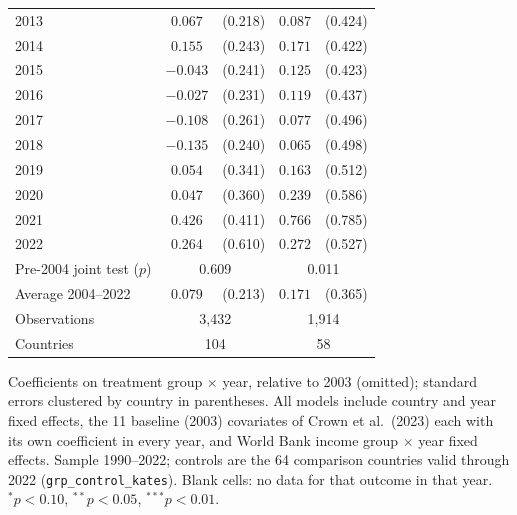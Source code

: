 \begin{table}[htbp]
\begin{tabular}{lcccc}
2013 & $0.067$ & (0.218) & $0.087$ & (0.424) \\
2014 & $0.155$ & (0.243) & $0.171$ & (0.422) \\
2015 & $-0.043$ & (0.241) & $0.125$ & (0.423) \\
2016 & $-0.027$ & (0.231) & $0.119$ & (0.437) \\
2017 & $-0.108$ & (0.261) & $0.077$ & (0.496) \\
2018 & $-0.135$ & (0.240) & $0.065$ & (0.498) \\
2019 & $0.054$ & (0.341) & $0.163$ & (0.512) \\
2020 & $0.047$ & (0.360) & $0.239$ & (0.586) \\
2021 & $0.426$ & (0.411) & $0.766$ & (0.785) \\
2022 & $0.264$ & (0.610) & $0.272$ & (0.527) \\
\midrule
Pre-2004 joint test ($p$) & \multicolumn{2}{c}{0.609} & \multicolumn{2}{c}{0.011} \\
Average 2004--2022 & $0.079$ & (0.213) & $0.171$ & (0.365) \\
Observations & \multicolumn{2}{c}{3,432} & \multicolumn{2}{c}{1,914} \\
Countries & \multicolumn{2}{c}{104} & \multicolumn{2}{c}{58} \\
\bottomrule
\end{tabular}
\par\vspace{4pt}
\begin{minipage}{\textwidth}\footnotesize Coefficients on treatment group $\times$ year, relative to 2003 (omitted); standard errors clustered by country in parentheses. All models include country and year fixed effects, the 11 baseline (2003) covariates of Crown et al.\ (2023) each with its own coefficient in every year, and World Bank income group $\times$ year fixed effects. Sample 1990--2022; controls are the 64 comparison countries valid through 2022 (\texttt{grp\_control\_kates}). Blank cells: no data for that outcome in that year. $^{*}p<0.10$, $^{**}p<0.05$, $^{***}p<0.01$.\end{minipage}
\end{table}
